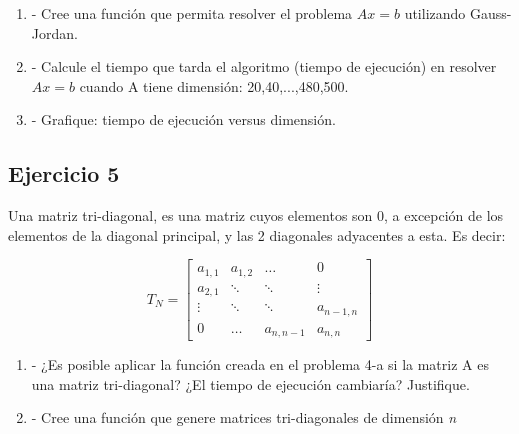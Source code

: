 \documentclass[a4paper, 11pt]{article}
\begin{document}
\begin{enumerate}[label=\alph*]
\item- Cree una función que permita resolver el problema $A x=b$ utilizando Gauss-Jordan.
\item- Calcule el tiempo que tarda el algoritmo (tiempo de ejecución) en resolver $A x=b$ cuando A tiene dimensión: 20,40,...,480,500.
\item- Grafique: tiempo de ejecución versus dimensión.
\end{enumerate}

\subsection*{Ejercicio 5}

Una matriz tri-diagonal, es una matriz cuyos elementos son 0, a excepción de los elementos de la diagonal principal, y las 2 diagonales adyacentes a esta. Es decir:

\begin{equation} \label{myeq}
T_N = \left[ \begin{matrix}
a_{1,1} & a_{1,2} & \hdots & 0\\
a_{2,1} & \ddots & \ddots &  \vdots\\
\vdots & \ddots & \ddots & a_{n-1,n} \\
0 & \hdots & a_{n,n-1} & a_{n,n} \end{matrix} \right]
\end{equation}


\begin{enumerate}[label=\alph*]
\item- ¿Es posible aplicar la función creada en el problema 4-a si la matriz A es una matriz tri-diagonal? ¿El tiempo de ejecución cambiaría? Justifique. 
\item- Cree una función que genere matrices tri-diagonales de dimensión \textit{n}
\end{enumerate}
\end{document}
